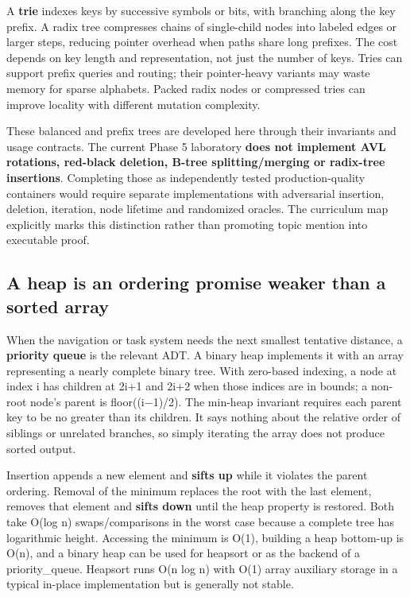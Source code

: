 A \textbf{trie} indexes keys by successive symbols or bits, with branching along the key prefix. A radix tree compresses chains of single-child nodes into labeled edges or larger steps, reducing pointer overhead when paths share long prefixes. The cost depends on key length and representation, not just the number of keys. Tries can support prefix queries and routing; their pointer-heavy variants may waste memory for sparse alphabets. Packed radix nodes or compressed tries can improve locality with different mutation complexity.

These balanced and prefix trees are developed here through their invariants and usage contracts. The current Phase 5 laboratory \textbf{does not implement AVL rotations, red-black deletion, B-tree splitting/merging or radix-tree insertions}. Completing those as independently tested production-quality containers would require separate implementations with adversarial insertion, deletion, iteration, node lifetime and randomized oracles. The curriculum map explicitly marks this distinction rather than promoting topic mention into executable proof.

\subsection{A heap is an ordering promise weaker than a sorted array}\label{05-engine-i-ch007-a-heap-is-an-ordering-promise-weaker-than-a-sorted-array}

When the navigation or task system needs the next smallest tentative distance, a \textbf{priority queue} is the relevant ADT. A binary heap implements it with an array representing a nearly complete binary tree. With zero-based indexing, a node at index i has children at 2i+1 and 2i+2 when those indices are in bounds; a non-root node's parent is floor((i−1)/2). The min-heap invariant requires each parent key to be no greater than its children. It says nothing about the relative order of siblings or unrelated branches, so simply iterating the array does not produce sorted output.

Insertion appends a new element and \textbf{sifts up} while it violates the parent ordering. Removal of the minimum replaces the root with the last element, removes that element and \textbf{sifts down} until the heap property is restored. Both take O(log n) swaps/comparisons in the worst case because a complete tree has logarithmic height. Accessing the minimum is O(1), building a heap bottom-up is O(n), and a binary heap can be used for heapsort or as the backend of a priority\_queue. Heapsort runs O(n log n) with O(1) array auxiliary storage in a typical in-place implementation but is generally not stable.


